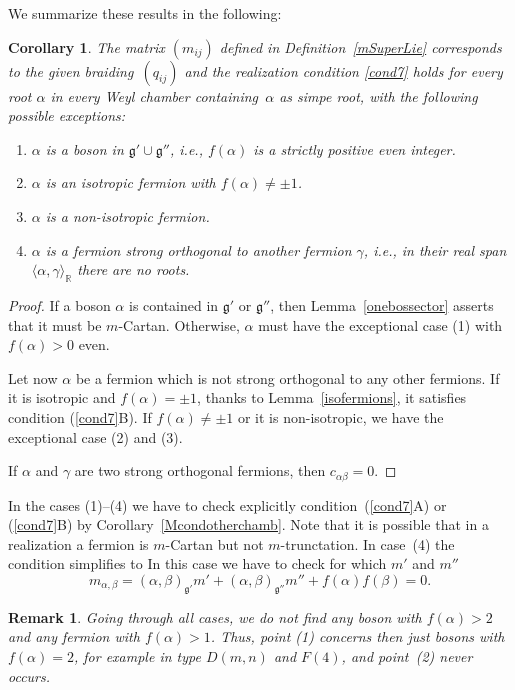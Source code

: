 \documentclass[pdftex]{sigma}%
\numberwithin{equation}{section}
\newtheorem{cor}[teo]{Corollary}
\newtheorem{oss}[teo]{Remark} }
\begin{document}
We summarize these results in the following:
\begin{cor}\label{3 conditions II}
The matrix $(m_{ij})$ defined in Definition~{\rm \ref{mSuperLie}} corresponds to the given braiding~$(q_{ij})$ and the realization condition \eqref{cond7} holds for every root $\alpha$ in every Weyl chamber containing~$\alpha$ as simpe root, with the following possible exceptions:
\begin{enumerate}\itemsep=0pt
	\item[$1.$] $\alpha$ is a boson in $\mathfrak{g'}\cup \mathfrak{g''}$, i.e., $f(\alpha)$ is a strictly positive even integer.
	\item[$2.$] $\alpha$ is an isotropic fermion with $f(\alpha) \neq \pm 1$.
	\item[$3.$] $\alpha$ is a non-isotropic fermion.
	\item[$4.$] $\alpha$ is a fermion strong orthogonal to another fermion $\gamma$, i.e., in their real span $\langle \alpha, \gamma \rangle_\mathbb{R}$ there are no roots.
\end{enumerate}
\end{cor}

\begin{proof} If a boson $\alpha$ is contained in $\mathfrak{g'}$ or $\mathfrak{g''}$, then Lemma~\ref{onebossector} asserts that it must be $m$-Cartan. Otherwise, $\alpha$ must have the exceptional case (1) with $f(\alpha)>0$ even.

Let now $\alpha$ be a fermion which is not strong orthogonal to any other fermions. If it is isotropic and $f(\alpha) = \pm 1$, thanks to Lemma~\ref{isofermions}, it satisfies condition (\ref{cond7}B). If $f(\alpha) \neq \pm 1$ or it is non-isotropic, we have the exceptional case (2) and (3).

If $\alpha$ and $\gamma$ are two strong orthogonal fermions, then $c_{\alpha\beta}=0$.
\end{proof}

In the cases (1)--(4) we have to check explicitly condition~(\ref{cond7}A) or (\ref{cond7}B) by Corollary~\ref{Mcondotherchamb}. Note that it is possible that in a realization a fermion is $m$-Cartan but not $m$-trunctation. In case~(4) the condition simplifies to
In this case we have to check for which $m'$ and $m''$
\[m_{\alpha,\beta}=(\alpha,\beta)_\mathfrak{g'} m' + (\alpha,\beta)_\mathfrak{g''} m'' + f(\alpha)f(\beta) =0.\]

\begin{oss} Going through all cases, we do not find any boson with $f(\alpha)>2$ and any fermion with $f(\alpha)>1$. Thus, point (1) concerns then just bosons with $f(\alpha)=2$, for example in type $D(m,n)$ and $F(4)$, and point~(2) never occurs.
\end{oss}
\end{document}
